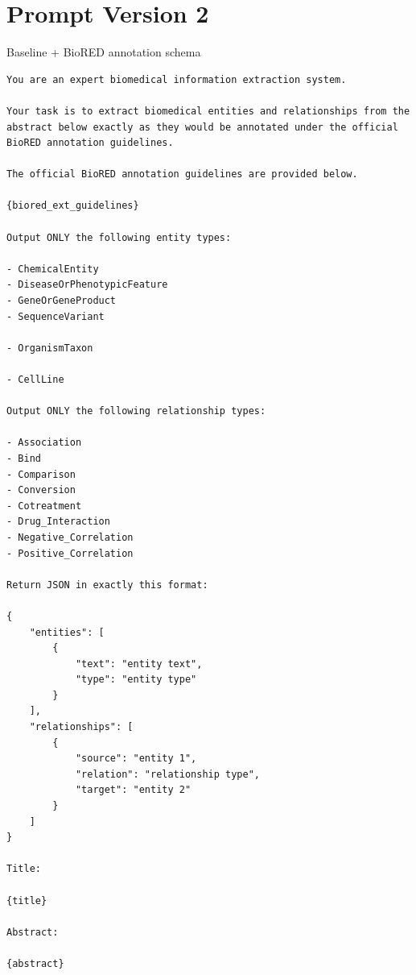 \section{Prompt Version 2}
Baseline + BioRED annotation schema
\begin{lstlisting}
You are an expert biomedical information extraction system.

Your task is to extract biomedical entities and relationships from the abstract below exactly as they would be annotated under the official BioRED annotation guidelines.

The official BioRED annotation guidelines are provided below.

{biored_ext_guidelines}

Output ONLY the following entity types:

- ChemicalEntity
- DiseaseOrPhenotypicFeature
- GeneOrGeneProduct
- SequenceVariant

- OrganismTaxon

- CellLine

Output ONLY the following relationship types:

- Association
- Bind
- Comparison
- Conversion
- Cotreatment
- Drug_Interaction
- Negative_Correlation
- Positive_Correlation

Return JSON in exactly this format:

{
	"entities": [
		{
			"text": "entity text",
			"type": "entity type"
		}
	],
	"relationships": [
		{
			"source": "entity 1",
			"relation": "relationship type",
			"target": "entity 2"
		}
	]
}

Title:

{title}

Abstract:

{abstract}
\end{lstlisting}

